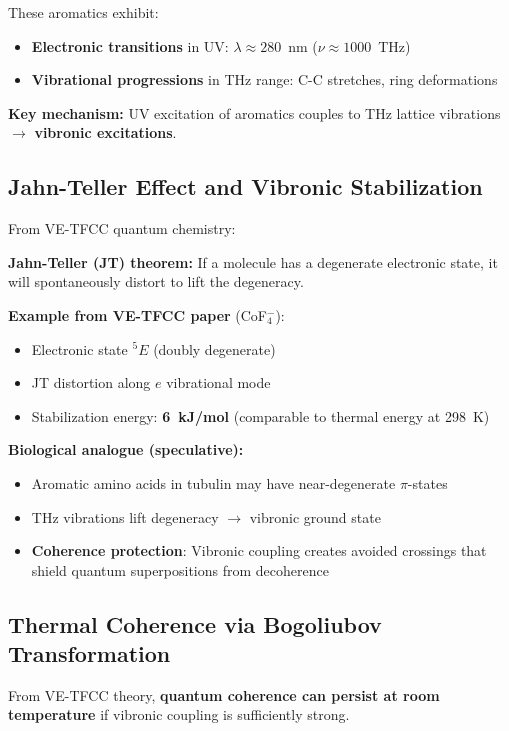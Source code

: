 These aromatics exhibit:
\begin{itemize}
\item \textbf{Electronic transitions} in UV: $\lambda \approx 280$~nm ($\nu \approx 1000$~THz)
\item \textbf{Vibrational progressions} in THz range: C-C stretches, ring deformations
\end{itemize}

\textbf{Key mechanism:} UV excitation of aromatics couples to THz lattice vibrations $\rightarrow$ \textbf{vibronic excitations}.

\subsection{Jahn-Teller Effect and Vibronic Stabilization}

From VE-TFCC quantum chemistry:

\textbf{Jahn-Teller (JT) theorem:} If a molecule has a degenerate electronic state, it will spontaneously distort to lift the degeneracy.

\textbf{Example from VE-TFCC paper} (CoF$_4^-$):
\begin{itemize}
\item Electronic state $^5E$ (doubly degenerate)
\item JT distortion along $e$ vibrational mode
\item Stabilization energy: \textbf{6~kJ/mol} (comparable to thermal energy at 298~K)
\end{itemize}

\textbf{Biological analogue (speculative):}
\begin{itemize}
\item Aromatic amino acids in tubulin may have near-degenerate $\pi$-states
\item THz vibrations lift degeneracy $\rightarrow$ vibronic ground state
\item \textbf{Coherence protection}: Vibronic coupling creates avoided crossings that shield quantum superpositions from decoherence
\end{itemize}

\subsection{Thermal Coherence via Bogoliubov Transformation}

From VE-TFCC theory, \textbf{quantum coherence can persist at room temperature} if vibronic coupling is sufficiently strong.

